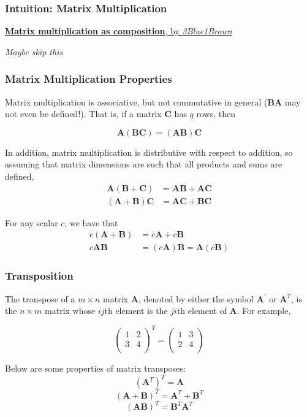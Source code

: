 \documentclass{beamer}
\begin{document}
 \begin{frame}
\frametitle{Intuition: Matrix Multiplication}

\href{https://www.youtube.com/watch?v=XkY2DOUCWMU&index=4&list=PLZHQObOWTQDPD3MizzM2xVFitgF8hE_ab}{\textbf{Matrix multiplication as composition}, by \textit{3Blue1Brown}}

\textit{Maybe skip this}

\end{frame}

\begin{frame}
\frametitle{Matrix Multiplication Properties}
Matrix multiplication is associative, but not commutative in general ($\mathbf{BA}$ may not even be defined!).  That is, if a matrix $\mathbf{C}$ has $q$ rows, then

\[\mathbf{A}(\mathbf{BC}) = (\mathbf{AB})\mathbf{C}\]

In addition, matrix multiplication is distributive with respect to addition, so assuming that matrix dimensions are such that all products and sums are defined,
\begin{align*}
\mathbf{A} (\mathbf{B} + \mathbf{C}) &= \mathbf{AB} + \mathbf{AC}\\
(\mathbf{A} + \mathbf{B}) \mathbf{C}  &= \mathbf{AC} + \mathbf{BC}
\end{align*}

For any scalar $c$, we have that
\begin{align*}
c(\mathbf{A} + \mathbf{B}) &= c\mathbf{A} + c\mathbf{B}\\
c\mathbf{AB} &= (c\mathbf{A})\mathbf{B} = \mathbf{A}(c\mathbf{B})
\end{align*}
\end{frame}

\begin{frame}
\frametitle{Transposition}
The transpose of a $m \times n$ matrix $\mathbf{A}$, denoted by either the symbol $\mathbf{A}^{'}$ or $\mathbf{A}^T$, is the $n \times m$ matrix whose $ij$th element is the $ji$th element of $\mathbf{A}$.  For example,

\[
\begin{pmatrix}
    1 & 2\\
    3 & 4 \\
\end{pmatrix}^T
= 
\begin{pmatrix}
    1 & 3\\
    2 & 4 \\
\end{pmatrix}
\]

Below are some properties of matrix transposes:
\[
(\mathbf{A}^T)^T = \mathbf{A}
\]
\[
(\mathbf{A} + \mathbf{B})^{T} = \mathbf{A}^T + \mathbf{B}^T
\]
\[
(\mathbf{A}\mathbf{B})^{T} = \mathbf{B}^T\mathbf{A}^T
\]

\end{frame}
\end{document}
